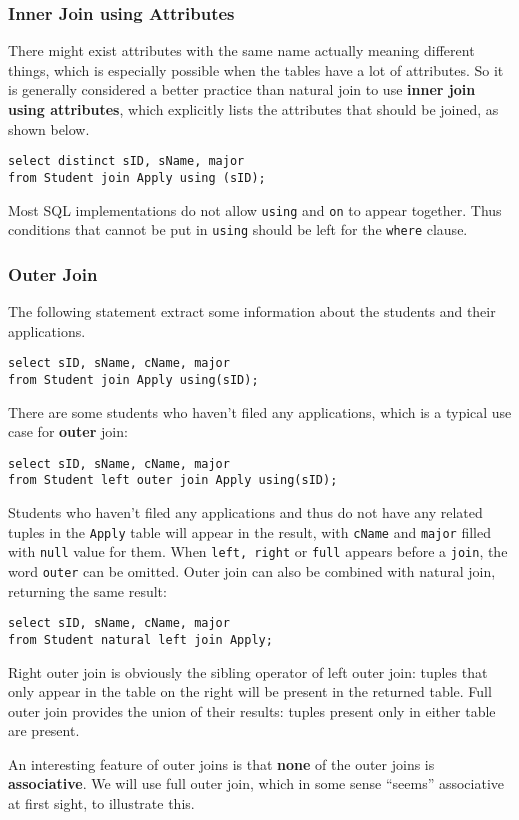 \subsubsection{Inner Join using Attributes}
There might exist attributes with the same name actually meaning different things, which is especially possible when the tables have a lot of attributes. So it is generally considered a better practice than natural join to use \textbf{inner join using attributes}, which explicitly lists the attributes that should be joined, as shown below.
\begin{lstlisting}
select distinct sID, sName, major
from Student join Apply using (sID);
\end{lstlisting}
Most SQL implementations do not allow \texttt{using} and \texttt{on} to appear together. Thus conditions that cannot be put in \texttt{using} should be left for the \texttt{where} clause.
\subsubsection{Outer Join}
The following statement extract some information about the students and their applications.
\begin{lstlisting}
select sID, sName, cName, major
from Student join Apply using(sID);
\end{lstlisting}
There are some students who haven't filed any applications, which is a typical use case for \textbf{outer} join:
\begin{lstlisting}
select sID, sName, cName, major
from Student left outer join Apply using(sID);
\end{lstlisting}
Students who haven't filed any applications and thus do not have any related tuples in the \texttt{Apply} table will appear in the result, with \texttt{cName} and \texttt{major} filled with \texttt{null} value for them. When \texttt{left, right} or \texttt{full} appears before a \texttt{join}, the word \texttt{outer} can be omitted. Outer join can also be combined with natural join, returning the same result:
\begin{lstlisting}
select sID, sName, cName, major
from Student natural left join Apply;
\end{lstlisting}
Right outer join is obviously the sibling operator of left outer join: tuples that only appear in the table on the right will be present in the returned table. Full outer join provides the union of their results: tuples present only in either table are present. 

An interesting feature of outer joins is that \textbf{none} of the outer joins is \textbf{associative}. We will use full outer join, which in some sense ``seems'' associative at first sight, to illustrate this. 

